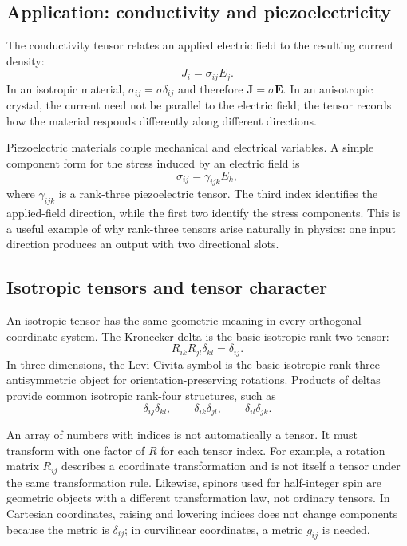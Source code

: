 \subsection{Application: conductivity and piezoelectricity}
The conductivity tensor relates an applied electric field to the resulting current density:
\begin{equation}
J_i=\sigma_{ij}E_j.
\end{equation}
In an isotropic material, $\sigma_{ij}=\sigma\delta_{ij}$ and therefore $\mathbf{J}=\sigma\mathbf{E}$. In an anisotropic crystal, the current need not be parallel to the electric field; the tensor records how the material responds differently along different directions.

Piezoelectric materials couple mechanical and electrical variables. A simple component form for the stress induced by an electric field is
\begin{equation}
\sigma_{ij}=\gamma_{ijk}E_k,
\end{equation}
where $\gamma_{ijk}$ is a rank-three piezoelectric tensor. The third index identifies the applied-field direction, while the first two identify the stress components. This is a useful example of why rank-three tensors arise naturally in physics: one input direction produces an output with two directional slots.

\subsection{Isotropic tensors and tensor character}
An isotropic tensor has the same geometric meaning in every orthogonal coordinate system. The Kronecker delta is the basic isotropic rank-two tensor:
\begin{equation}
R_{ik}R_{jl}\delta_{kl}=\delta_{ij}.
\end{equation}
In three dimensions, the Levi-Civita symbol is the basic isotropic rank-three antisymmetric object for orientation-preserving rotations. Products of deltas provide common isotropic rank-four structures, such as
\begin{equation}
\delta_{ij}\delta_{kl},
\qquad
\delta_{ik}\delta_{jl},
\qquad
\delta_{il}\delta_{jk}.
\end{equation}

An array of numbers with indices is not automatically a tensor. It must transform with one factor of $R$ for each tensor index. For example, a rotation matrix $R_{ij}$ describes a coordinate transformation and is not itself a tensor under the same transformation rule. Likewise, spinors used for half-integer spin are geometric objects with a different transformation law, not ordinary tensors. In Cartesian coordinates, raising and lowering indices does not change components because the metric is $\delta_{ij}$; in curvilinear coordinates, a metric $g_{ij}$ is needed.

